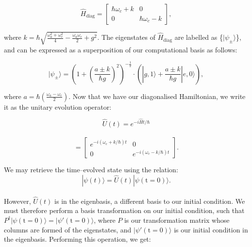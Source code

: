 \documentclass[11pt]{article}
\begin{document}
\begin{equation*}
    \hat{H}_{\scriptscriptstyle \text{diag}} = 
    \begin{bmatrix}
        \hbar\omega_c + k & 0 \\
        0 & \hbar\omega_c - k
    \end{bmatrix},
\end{equation*}

where $k = \hbar\sqrt{\frac{\omega_a^2 + \omega_c^2}{4} - \frac{\omega_a\omega_c}{2} + g^2}$. The eigenstates of $\hat{H}_{\scriptscriptstyle \text{diag}}$ are labelled as \{$|\psi_\pm\rangle$\}, and can be expressed as a superposition of our computational basis as follows:

\begin{equation*}
    |\psi_\pm\rangle = \left(1 + \left(\frac{a\pm k}{\hbar g}\right)^2\right)^{-\frac{1}{2}} \cdot\left(|g,1\rangle + \frac{a\pm k}{\hbar g}|e,0\rangle\right),
\end{equation*}

where $a = \hbar\left(\frac{\omega_a - \omega_c}{2}\right)$. Now that we have our diagonalised Hamiltonian, we write it as the unitary evolution operator:

\begin{equation*}
    \hat{U}(t) = e^{-i\hat{H}t/\hbar}
\end{equation*}
\\ 
\begin{equation*}
    = 
    \begin{bmatrix}
        e^{-i(\omega_c + k/\hbar)t} & 0 \\
        0 & e^{-i(\omega_c - k/\hbar)t}
    \end{bmatrix}.
\end{equation*}

We may retrieve the time--evolved state using the relation:
\begin{equation} \label{unitary_evo_eqn}
    |\psi(t)\rangle = \hat{U}(t)|\psi(\text{t}=0)\rangle.
\end{equation}
\\
However, $\hat{U}(t)$ is in the eigenbasis, a different basis to our initial condition. We must therefore perform a basis transformation on our initial condition, such that $P^\dagger|\psi(\text{t} = 0)\rangle = |\psi'(\text{t} = 0)\rangle$, where $P$ is our transformation matrix whose columns are formed of the eigenstates, and $|\psi'(\text{t} = 0)\rangle$ is our initial condition in the eigenbasis. Performing this operation, we get:
\end{document}
